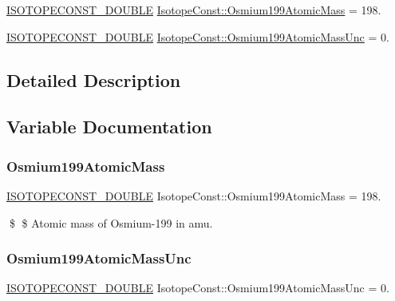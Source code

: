 \begin{DoxyCompactItemize}
\item 
\mbox{\hyperlink{group___isotope_const-_macros_ga8f45a7272ce02c0b4c65c44636ed719a}{I\+S\+O\+T\+O\+P\+E\+C\+O\+N\+S\+T\+\_\+\+D\+O\+U\+B\+LE}} \mbox{\hyperlink{group___isotope_const-_osmium-_os199_gac88c8a0c4f66277bcd4fec955ce30875}{Isotope\+Const\+::\+Osmium199\+Atomic\+Mass}} = 198.
\item 
\mbox{\hyperlink{group___isotope_const-_macros_ga8f45a7272ce02c0b4c65c44636ed719a}{I\+S\+O\+T\+O\+P\+E\+C\+O\+N\+S\+T\+\_\+\+D\+O\+U\+B\+LE}} \mbox{\hyperlink{group___isotope_const-_osmium-_os199_ga716b71ef77cc5d1e05e467e5389806ee}{Isotope\+Const\+::\+Osmium199\+Atomic\+Mass\+Unc}} = 0.
\end{DoxyCompactItemize}


\subsection{Detailed Description}


\subsection{Variable Documentation}
\mbox{\label{group___isotope_const-_osmium-_os199_gac88c8a0c4f66277bcd4fec955ce30875}} 
\subsubsection{\texorpdfstring{Osmium199\+Atomic\+Mass}{Osmium199AtomicMass}}
{\footnotesize\ttfamily \mbox{\hyperlink{group___isotope_const-_macros_ga8f45a7272ce02c0b4c65c44636ed719a}{I\+S\+O\+T\+O\+P\+E\+C\+O\+N\+S\+T\+\_\+\+D\+O\+U\+B\+LE}} Isotope\+Const\+::\+Osmium199\+Atomic\+Mass = 198.}

\$ \$ Atomic mass of Osmium-\/199 in amu. \mbox{\label{group___isotope_const-_osmium-_os199_ga716b71ef77cc5d1e05e467e5389806ee}} 
\subsubsection{\texorpdfstring{Osmium199\+Atomic\+Mass\+Unc}{Osmium199AtomicMassUnc}}
{\footnotesize\ttfamily \mbox{\hyperlink{group___isotope_const-_macros_ga8f45a7272ce02c0b4c65c44636ed719a}{I\+S\+O\+T\+O\+P\+E\+C\+O\+N\+S\+T\+\_\+\+D\+O\+U\+B\+LE}} Isotope\+Const\+::\+Osmium199\+Atomic\+Mass\+Unc = 0.}

